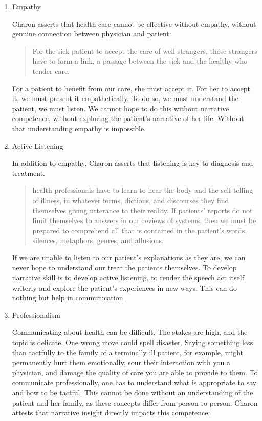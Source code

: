 \documentclass[doc,12pt]{apa6}
\begin{document}
\begin{enumerate}
\def\labelenumi{\arabic{enumi}.}

\item
  Empathy

  Charon asserts that health care cannot be effective without empathy, without
  genuine connection between physician and patient:

\begin{quote}
	For the sick patient to accept the care of well strangers, those strangers
	have to form a link, a passage between the sick and the healthy who tender
	care. \cite[p.~21]{Charon06}
\end{quote}

  For a patient to benefit from our care, she must accept it. For her to accept
  it, we must present it empathetically. To do so, we must understand the
  patient, we must listen. We cannot hope to do this without narrative
  competence, without exploring the patient's narrative of her life. Without
  that understanding empathy is impossible.

\item
  Active Listening

  In addition to empathy, Charon asserts that listening is key to diagnosis and
  treatment.

\begin{quote}
	health professionals have to learn to hear the body and the self telling
	of illness, in whatever forms, dictions, and discourses they find
	themselves giving utterance to their reality. If patients' reports do not
	limit themselves to answers in our reviews of systems, then we must be
	prepared to comprehend all that is contained in the patient's words,
	silences, metaphors, genres, and allusions. \cite[p.~107]{Charon06}
\end{quote}

  If we are unable to listen to our patient's explanations as they are, we can
  never hope to understand our treat the patients themselves. To develop
  narrative skill is to develop active listening, to render the speech act
  itself writerly and explore the patient's experiences in new ways. This can
  do nothing but help in communication.

\item
  Professionalism

  Communicating about health can be difficult. The stakes are high, and the
  topic is delicate. One wrong move could spell disaster. Saying something less
  than tactfully to the family of a terminally ill patient, for example, might
  permanently hurt them emotionally, sour their interaction with you a
  physician, and damage the quality of care you are able to provide to them. To
  communicate professionally, one has to understand what is appropriate to say
  and how to be tactful.  This cannot be done without an understanding of the
  patient and her family, as these concepts differ from person to person.
  Charon attests that narrative insight directly impacts this competence:


\end{enumerate}
\end{document}
